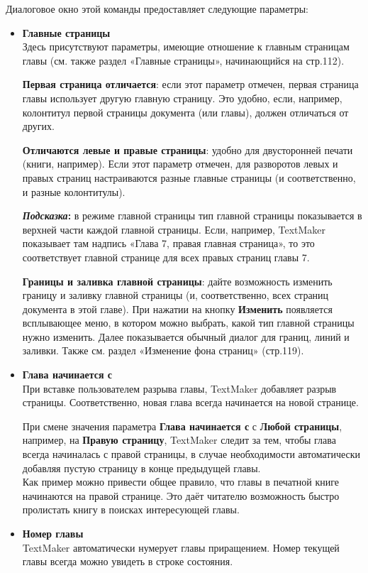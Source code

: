 \documentclass[a4paper,10pt]{article}
\begin{document}
Диалоговое окно этой команды предоставляет следующие параметры:
\begin{itemize}
 \item \textbf{Главные страницы}\\
 Здесь присутствуют параметры, имеющие отношение к главным страницам главы (см. также раздел «Главные страницы», начинающийся на стр.112).
 
 \textbf{Первая страница отличается}: если этот параметр отмечен, первая страница главы использует другую главную страницу. Это удобно, если, например, колонтитул первой страницы документа (или главы), должен отличаться от других.
 
 \textbf{Отличаются левые и правые страницы}: удобно для двусторонней печати (книги, например). Если этот параметр отмечен, для разворотов левых и правых страниц настраиваются разные главные страницы (и соответственно, и разные колонтитулы).\\
 \begin{mdframed}[backgroundcolor=blue!10]
\textbf{\textit{Подсказка}:} в режиме главной страницы тип главной страницы показывается в верхней части каждой главной страницы. Если, например, TextMaker показывает там надпись «Глава 7, правая главная страница», то это соответствует главной странице для всех правых страниц главы 7.
\end{mdframed}

\textbf{Границы и заливка главной страницы}: дайте возможность изменить границу и заливку главной страницы (и, соответственно, всех страниц документа в этой главе). При нажатии на кнопку \textbf{Изменить} появляется всплывающее меню, в котором можно выбрать, какой тип главной страницы нужно изменить. Далее показывается обычный диалог для границ, линий и заливки. Также см. раздел «Изменение фона страниц» (стр.119).
\item \textbf{Глава начинается с}\\
При вставке пользователем разрыва главы, TextMaker добавляет разрыв страницы. Соответственно, новая глава всегда начинается на новой странице.

При смене значения параметра \textbf{Глава начинается с} с \textbf{Любой страницы}, например, на \textbf{Правую страницу}, TextMaker следит за тем, чтобы глава всегда начиналась с правой страницы, в случае необходимости автоматически добавляя пустую страницу в конце предыдущей главы.\\
Как пример можно привести общее правило, что главы в печатной книге начинаются на правой странице. Это даёт читателю возможность быстро пролистать книгу в поисках интересующей главы.
\item \textbf{Номер главы}\\
TextMaker автоматически нумерует главы приращением. Номер текущей главы всегда можно увидеть в строке состояния.


\end{itemize}
\end{document}
